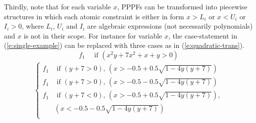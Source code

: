 \documentclass{article}
\newcommand{\case}[2]{#2 &\text{ if } #1}%
\newcommand{\singlecase}[2]{#2 \quad \text{ if } #1}
\begin{document}
Thirdly, note that for each variable $x$, 
PPPFs can be transformed into piecewise structures 
in which each atomic constraint is either in form $x>L_i$ or $x<U_i$ or $I_i>0$, 
where $L_i$, $U_i$ and $I_i$ are 
algebraic expressions (not necessarily polynomials) and $x$ is not in their scope. 
For instance for variable $x$, the case-statement in (\ref{e:single-example})
can be replaced with three cases as in (\ref{e:quadratic-trans}).
{
\footnotesize
\begin{equation}
\label{e:single-example}
\singlecase{(x^2 y + 7x^2 + x + y > 0)}{f_1}
\end{equation}
\begin{align}
\label{e:quadratic-trans}
{
\begin{cases}
  \case{(y+7>0), \, (x> -0.5 + 0.5\sqrt{1 - 4y(y+7)}) }{f_1} \\ 
  \case{(y+7>0), \, (x> -0.5 - 0.5\sqrt{1 - 4y(y+7)}) }{f_1} \\ 
  \case{(y+7<0), \, (x > -0.5 + 0.5\sqrt{1 - 4y(y+7)}),\\
& (x < -0.5 - 0.5\sqrt{1 - 4y(y+7)}) }{f_1} \\ 
 \end{cases}
}
\end{align}
}
\end{document}
